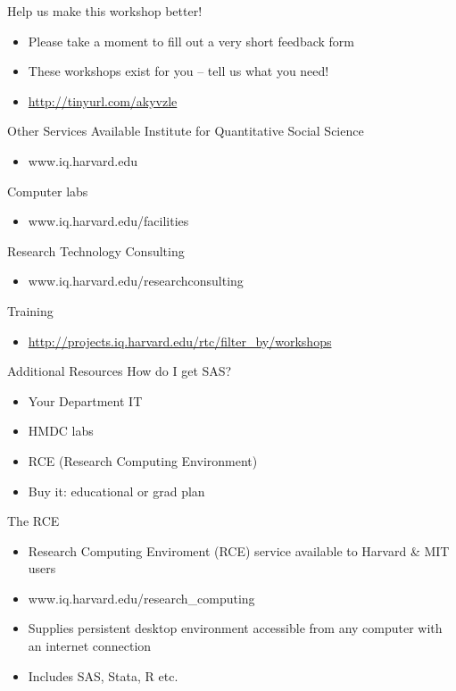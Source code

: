 \documentclass[table,smaller]{beamer}
\begin{document}
\begin{frame}[label=sec-6-1]{Help us make this workshop better!}
\begin{itemize}
\item Please take a moment to fill out a very short feedback form

\item These workshops exist for you – tell us what you need!

\item \url{http://tinyurl.com/akyvzle}
\end{itemize}
\end{frame}
\begin{frame}[label=sec-6-2]{Other Services Available}
Institute for Quantitative Social Science
\begin{itemize}
\item www.iq.harvard.edu
\end{itemize}
Computer labs
\begin{itemize}
\item www.iq.harvard.edu/facilities
\end{itemize}
Research Technology Consulting
\begin{itemize}
\item www.iq.harvard.edu/researchconsulting
\end{itemize}
Training
\begin{itemize}
\item \url{http://projects.iq.harvard.edu/rtc/filter_by/workshops}
\end{itemize}
\end{frame}
\begin{frame}[label=sec-6-3]{Additional Resources}
How do I get SAS?
\begin{itemize}
\item Your Department IT
\item HMDC labs
\item RCE (Research Computing Environment)
\item Buy it: educational or grad plan
\end{itemize}

The RCE
\begin{itemize}
\item Research Computing Enviroment (RCE) service available to
Harvard \& MIT users
\item www.iq.harvard.edu/research\_computing
\item Supplies persistent desktop environment accessible from
any computer with an internet connection
\item Includes SAS, Stata, R etc.
\end{itemize}
\end{frame}
\end{document}
